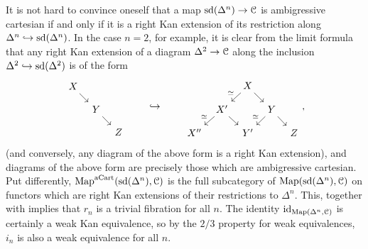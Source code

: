 \documentclass[main.tex]{subfiles}
\begin{document}
\begin{example}
  It is not hard to convince oneself that a map $\mathrm{sd}(\Delta^{n}) \to \mathcal{C}$ is ambigressive cartesian if and only if it is a right Kan extension of its restriction along $\Delta^{n} \hookrightarrow \mathrm{sd}(\Delta^{n})$. In the case $n = 2$, for example, it is clear from the limit formula that any right Kan extension of a diagram $\Delta^{2} \to \mathcal{C}$ along the inclusion $\Delta^{2} \hookrightarrow \mathrm{sd}(\Delta^{2})$ is of the form
  \begin{equation*}
    \begin{tikzcd}[row sep=small, column sep=tiny]
      X
      \arrow[dr]
      \\
      & Y
      \arrow[dr]
      \\
      && Z
    \end{tikzcd}
    \qquad \hookrightarrow \qquad
    \begin{tikzcd}[row sep=small, column sep=tiny]
      && X
      \arrow[dl, swap, "\simeq"]
      \arrow[dr]
      \\
      & X'
      \arrow[dl, swap, "\simeq"]
      \arrow[dr]
      && Y
      \arrow[dl, swap, "\simeq"]
      \arrow[dr]
      \\
      X''
      && Y'
      && Z
    \end{tikzcd},
  \end{equation*}
  (and conversely, any diagram of the above form is a right Kan extension), and diagrams of the above form are precisely those which are ambigressive cartesian. Put differently, $\mathrm{Map}^{\mathrm{aCart}}(\mathrm{sd}(\Delta^{n}), \mathcal{C})$ is the full subcategory of $\mathrm{Map}(\mathrm{sd}(\Delta^{n}), \mathcal{C})$ on functors which are right Kan extensions of their restrictions to $\Delta^{n}$. This, together with \cite[Prop.\ 4.3.2.15]{highertopostheory} implies that $r_{n}$ is a trivial fibration for all $n$. The identity $\mathrm{id}_{\mathrm{Map}(\Delta^{n}, \mathcal{C})}$ is certainly a weak Kan equivalence, so by the $2/3$ property for weak equivalences, $i_{n}$ is also a weak equivalence for all $n$.


\end{example}
\end{document}
